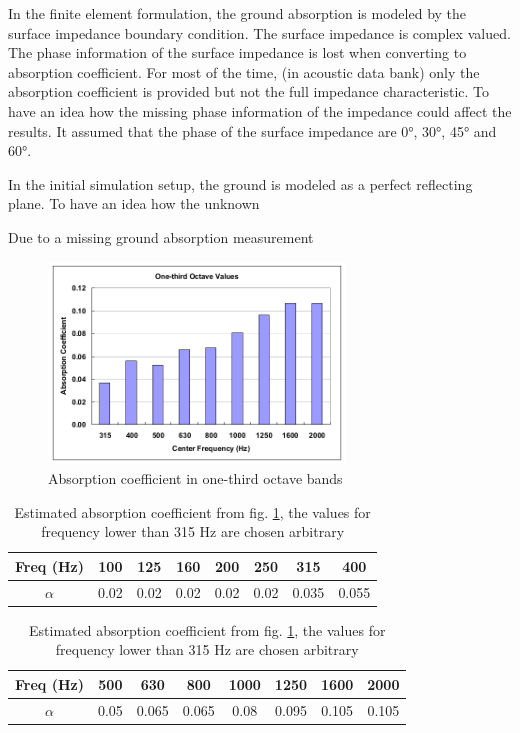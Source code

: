 In the finite element formulation, the ground absorption is modeled by the surface impedance boundary condition. The surface impedance is complex valued. The phase information of the surface impedance is lost when converting to absorption coefficient. For most of the time, (in acoustic data bank) only the absorption coefficient is provided but not the full impedance characteristic. To have an idea how the missing phase information of the impedance could affect the results. It assumed that the phase of the surface impedance are 0°, 30°, 45° and 60°.

In the initial simulation setup, the ground is modeled as a perfect reflecting plane. To have an idea how the unknown 

Due to a missing ground absorption measurement

\begin{figure}[H]
	\centering
	\includegraphics[width=0.7\textwidth]{fig/chap4/impedance/absorption_spectrum.png}
	\caption{Absorption coefficient in one-third octave bands \cite{Seybert2008MeasurementOP}}
	\label{fig:ground_absorption}
\end{figure}

\begin{table}[H]
	\caption{Estimated absorption coefficient from fig. \ref{fig:ground_absorption}, the values for frequency lower than 315 Hz are chosen arbitrary}
	\begin{tabular}{c|ccccccc}
		Freq (Hz)           & 100  & 125  & 160  & 200  & 250  & 315  & 400 \\ \hline
		$\alpha$ & 0.02 & 0.02 & 0.02 & 0.02 & 0.02 & 0.035 & 0.055
	\end{tabular}
	\newline
	\vspace*{10pt}
	\newline
	\begin{tabular}{c|ccccccc}
		Freq (Hz)  &  500  & 630  & 800  & 1000 & 1250 & 1600 & 2000 \\ \hline
		$\alpha$ & 0.05 & 0.065 & 0.065 & 0.08 & 0.095 & 0.105 & 0.105
	\end{tabular}
\end{table}

